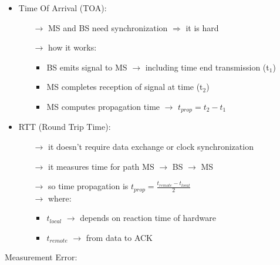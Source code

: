 \begin{itemize}
    \item Time Of Arrival (TOA):
    \begin{itemize}
        \item[$\rightarrow$] MS and BS need synchronization $\Rightarrow$ it is hard
        \item[$\rightarrow$] how it works:
        \begin{itemize}
            \item BS emits signal to MS $\rightarrow$ including time end transmission (t$_\text{1}$)
            \item MS completes reception of signal at time (t$_\text{2}$)
            \item MS computes propagation time $\rightarrow$ $t_{prop} = t_2 - t_1$
        \end{itemize}
    \end{itemize}
    \item RTT (Round Trip Time):
    \begin{itemize}
        \item[$\rightarrow$] it doesn't require data exchange or clock synchronization
        \item[$\rightarrow$] it measures time for path MS $\rightarrow$ BS $\rightarrow$ MS
        \item[$\rightarrow$] so time propagation is $t_{prop} = \frac{t_{remote} - t_{local}}{2}$\\[0.15cm]
        $\rightarrow$ where:
        \begin{itemize}
            \item $t_{local}$ $\rightarrow$ depends on reaction time of hardware
            \item $t_{remote}$ $\rightarrow$ from data to ACK
        \end{itemize}
    \end{itemize}
\end{itemize}
\vspace*{0.3cm}
Measurement Error:
